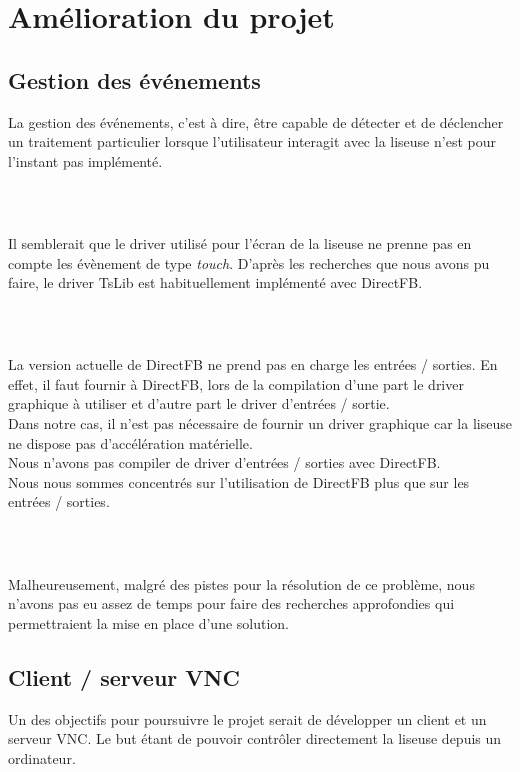 \chapter{Amélioration du projet}


\section{Gestion des événements}
La gestion des événements, c'est à dire, être capable de détecter et de déclencher un traitement particulier lorsque l'utilisateur interagit avec la liseuse n'est pour l'instant pas implémenté.
\paragraph*{~}
Il semblerait que le driver utilisé pour l'écran de la liseuse ne prenne pas en compte les évènement de type \emph{touch}. D'après les recherches que nous avons pu faire, le driver TsLib est habituellement implémenté avec DirectFB.
\paragraph*{~}
La version actuelle de DirectFB ne prend pas en charge les entrées / sorties. En effet, il faut fournir à DirectFB, lors de la compilation d'une part le driver graphique à utiliser et d'autre part le driver d'entrées / sortie.\\Dans notre cas, il n'est pas nécessaire de fournir un driver graphique car la liseuse ne dispose pas d'accélération matérielle.\\Nous n'avons pas compiler de driver d'entrées / sorties avec DirectFB.\\Nous nous sommes concentrés sur l'utilisation de DirectFB plus que sur les entrées / sorties.
\paragraph*{~}
Malheureusement, malgré des pistes pour la résolution de ce problème, nous n'avons pas eu assez de temps pour faire des recherches approfondies qui permettraient la mise en place d'une solution.


\section{Client / serveur VNC}

Un des objectifs pour poursuivre le projet serait de développer un client et un serveur VNC. Le but étant de pouvoir contrôler directement la liseuse depuis un ordinateur.

